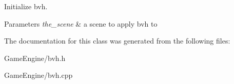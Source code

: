 Initialize bvh. 


\begin{DoxyParams}{Parameters}
{\em the\+\_\+scene} & a scene to apply bvh to \\
\hline
\end{DoxyParams}


The documentation for this class was generated from the following files\+:\begin{DoxyCompactItemize}
\item 
Game\+Engine/bvh.\+h\item 
Game\+Engine/bvh.\+cpp\end{DoxyCompactItemize}
